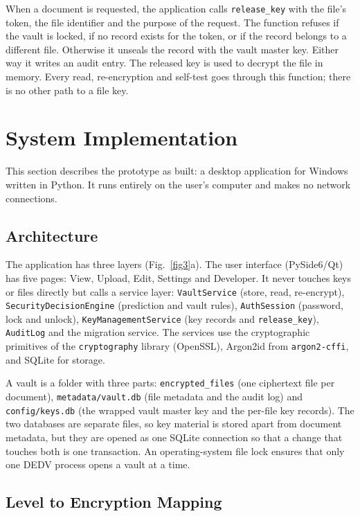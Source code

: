 \documentclass[pdflatex,sn-mathphys-num]{sn-jnl}
\newcommand{\code}[1]{\texttt{#1}}
\begin{document}
When a document is requested, the application calls \code{release\_key} with the file's token, the
file identifier and the purpose of the request. The function refuses if the vault is locked, if no
record exists for the token, or if the record belongs to a different file. Otherwise it unseals
the record with the vault master key. Either way it writes an audit entry. The released key is
used to decrypt the file in memory. Every read, re-encryption and self-test goes through this
function; there is no other path to a file key.

\section{System Implementation}\label{sec6}

This section describes the prototype as built: a desktop application for Windows written in
Python. It runs entirely on the user's computer and makes no network connections.

\subsection{Architecture}

The application has three layers (Fig.~\ref{fig3}a). The user interface (PySide6/Qt) has five
pages: View, Upload, Edit, Settings and Developer. It never touches keys or files directly but
calls a service layer: \code{VaultService} (store, read, re-encrypt), \code{SecurityDecisionEngine}
(prediction and vault rules), \code{AuthSession} (password, lock and unlock),
\code{KeyManagementService} (key records and \code{release\_key}), \code{AuditLog} and the
migration service. The services use the cryptographic primitives of the \code{cryptography}
library (OpenSSL), Argon2id from \code{argon2-cffi}, and SQLite for storage.

A vault is a folder with three parts: \code{encrypted\_files} (one ciphertext file per document),
\code{metadata/vault.db} (file metadata and the audit log) and \code{config/keys.db} (the wrapped
vault master key and the per-file key records). The two databases are separate files, so key
material is stored apart from document metadata, but they are opened as one SQLite connection so
that a change that touches both is one transaction. An operating-system file lock ensures that only
one DEDV process opens a vault at a time.

\subsection{Level to Encryption Mapping}
\end{document}
